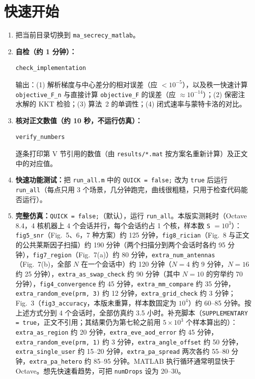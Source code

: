 \documentclass[11pt,a4paper]{ctexart}
\newcommand{\code}[1]{\texttt{#1}}
\begin{document}
\section{快速开始}
\begin{enumerate}
\item 把当前目录切换到 \code{ma\_secrecy\_matlab}。
\item \textbf{自检（约 1 分钟）：}
\begin{lstlisting}
check_implementation
\end{lstlisting}
输出：(1) 解析梯度与中心差分的相对误差（应 $<10^{-5}$），以及秩一快速计算 \code{objective\_F\_n} 与直接计算 \code{objective\_F} 的误差（应 $\approx10^{-14}$）；(2) 保密注水解的 KKT 检验；(3) 算法~2 的单调性；(4) 闭式速率与蒙特卡洛的对比。
\item \textbf{核对正文数值（约 10 秒，不运行仿真）：}
\begin{lstlisting}
verify_numbers
\end{lstlisting}
逐条打印第 V 节引用的数值（由 \code{results/*.mat} 按方案名重新计算）及正文中的对应值。
\item \textbf{快速功能测试：}把 \code{run\_all.m} 中的 \code{QUICK = false;} 改为 \code{true} 后运行 \code{run\_all}（每点只用 3 个场景，几分钟跑完，曲线很粗糙，只用于检查代码能否运行）。
\item \textbf{完整仿真：}\code{QUICK = false;}（默认），运行 \code{run\_all}。本版实测耗时（Octave 8.4，4 核机器上 4 个会话并行，每个会话约占 1 个核，样本数 \code{S} $=10^3$）：\code{fig5\_snr}（Fig.~5、6，7 种方案）约 125 分钟，\code{fig8\_rician}（Fig.~8 与正文的公共莱斯因子扫描）约 190 分钟（两个扫描分到两个会话时各约 95 分钟），\code{fig7\_region}（Fig.~7(a)）约 80 分钟，\code{extra\_num\_antennas}（Fig.~7(b)，全部 $N$ 在一个会话中）约 120 分钟（$N=4$ 约 9 分钟，$N=16$ 约 25 分钟），\code{extra\_as\_swap\_check} 约 90 分钟（其中 $N=10$ 的穷举约 70 分钟），\code{fig4\_convergence} 约 45 分钟，\code{extra\_mm\_compare} 约 35 分钟，\code{extra\_random\_eve(prm, 3)} 约 12 分钟，\code{extra\_grid\_check} 约 3 分钟；Fig.~3（\code{fig3\_accuracy}，本版未重算，样本数固定为 $10^4$）约 60--85 分钟。按上述方式分到 4 个会话时，全部仿真约 3.5 小时。补充脚本（\code{SUPPLEMENTARY = true}，正文不引用；其结果仍为第七轮之前用 $5\times10^3$ 个样本算出的）：\code{extra\_as\_region} 约 20 分钟，\code{extra\_eve\_aod\_error} 约 45 分钟，\code{extra\_random\_eve(prm, 1)} 约 3 分钟，\code{extra\_angle\_offset} 约 50 分钟，\code{extra\_single\_user} 约 15--20 分钟，\code{extra\_pa\_spread} 两次各约 55--80 分钟，\code{extra\_pa\_hetero} 约 85--95 分钟。MATLAB 执行循环通常明显快于 Octave。想先快速看趋势，可把 \code{numDrops} 设为 20--30。

\end{enumerate}
\end{document}
